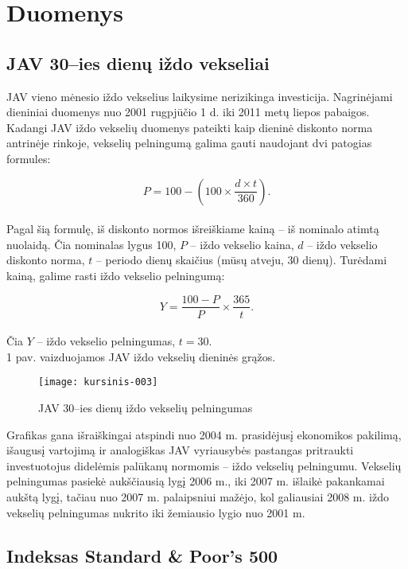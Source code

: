 \documentclass[12pt, a14paper, lithuanian]{article}
\begin{document}
\newpage
\section{Duomenys}
\subsection{JAV 30--ies dienų iždo vekseliai}

JAV vieno mėnesio iždo vekselius laikysime nerizikinga investicija. Nagrinėjami dieniniai duomenys nuo 2001 rugpjūčio 1 d. iki 2011 metų liepos pabaigos\cite{tbills}.
Kadangi JAV iždo vekselių duomenys pateikti kaip dieninė diskonto norma antrinėje rinkoje, vekselių pelningumą galima gauti naudojant dvi patogias formules:


$$P = 100 - \left( 100 \times \frac{d \times t}{360}\right) .$$\\

Pagal šią formulę, iš diskonto normos išreiškiame kainą -- iš nominalo atimtą nuolaidą. 
Čia nominalas lygus 100, $P$ -- iždo vekselio kaina, $d$ -- iždo vekselio diskonto norma,
$t$ -- periodo dienų skaičius (mūsų atveju, 30 dienų). 
Turėdami kainą, galime rasti iždo vekselio pelningumą:

$$Y = \frac{100 - P}{P} \times \frac{365}{t}.$$\\

Čia  $Y$ -- iždo vekselio pelningumas, $t = 30$. \\

1 pav. vaizduojamos JAV iždo vekselių dieninės grąžos.
   
\begin{figure}[H]
  \centering
\texttt{[image: kursinis-003]}
  \caption{JAV 30--ies dienų iždo vekselių pelningumas}
  \label{fig:1}
\end{figure}

Grafikas gana išraiškingai atspindi nuo 2004 m. prasidėjusį ekonomikos pakilimą, išaugusį vartojimą ir analogiškas
JAV vyriausybės pastangas pritraukti investuotojus didelėmis palūkanų normomis -- iždo vekselių pelningumu.
Vekselių pelningumas pasiekė aukščiausią lygį 2006 m., iki 2007 m. išlaikė pakankamai aukštą lygį, tačiau nuo 2007 m.
palaipsniui mažėjo, kol galiausiai 2008 m. iždo vekselių pelningumas nukrito iki žemiausio lygio nuo 2001 m. \\

\subsection{Indeksas Standard \& Poor's 500}
\end{document}
